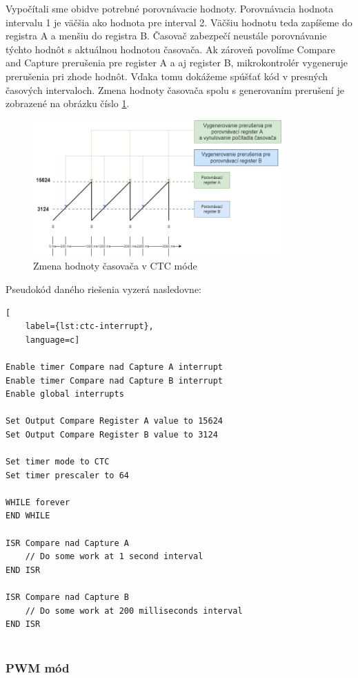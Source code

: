 Vypočítali sme obidve potrebné porovnávacie hodnoty. Porovnávacia hodnota intervalu 1 je väčšia ako hodnota pre interval 2. Väčšiu hodnotu teda zapíšeme do registra A a
menšiu do registra B. Časovač zabezpečí neustále porovnávanie týchto hodnôt s aktuálnou hodnotou časovača. Ak zároveň povolíme Compare and Capture prerušenia pre register
A a aj register B, mikrokontrolér vygeneruje prerušenia pri zhode hodnôt. Vďaka tomu dokážeme spúšťať kód v presných časových intervaloch. Zmena hodnoty časovača spolu
s generovaním prerušení je zobrazené na obrázku číslo \ref{figure:ctc-timer-value}.
\begin{figure}[!h]
    \centering
    \includegraphics[width=0.85\textwidth]{img/ctc-timer-value.png}
    \caption{Zmena hodnoty časovača v CTC móde}
    \label{figure:ctc-timer-value}
\end{figure}

Pseudokód daného riešenia vyzerá nasledovne:

\begin{lstlisting}[
    label={lst:ctc-interrupt},
    language=c]  

Enable timer Compare nad Capture A interrupt
Enable timer Compare nad Capture B interrupt
Enable global interrupts

Set Output Compare Register A value to 15624
Set Output Compare Register B value to 3124

Set timer mode to CTC
Set timer prescaler to 64

WHILE forever
END WHILE

ISR Compare nad Capture A
    // Do some work at 1 second interval
END ISR

ISR Compare nad Capture B
    // Do some work at 200 milliseconds interval 
END ISR


\end{lstlisting}

\subsubsection{PWM mód}